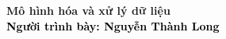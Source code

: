 \begin{frame}[noframenumbering]
    \thispagestyle{empty}
    \bfseries
    \begin{flushleft}
        \vfill
        \vspace{5mm}
        \textcolor{BlueDefault}{\huge \bfseries Mô hình hóa và xử lý dữ liệu} \\
        \vspace{10mm}
        \textcolor{black}{\large \bfseries Người trình bày: Nguyễn Thành Long}
        \vfill
    \end{flushleft}
\end{frame}